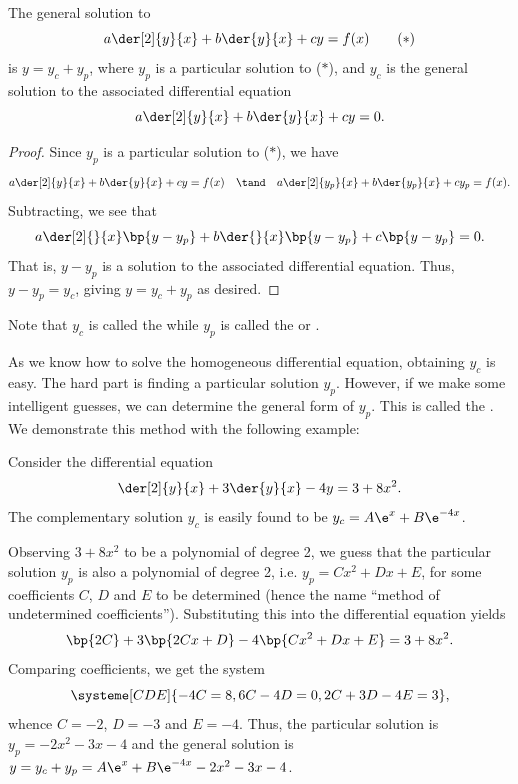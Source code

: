 \begin{theorem}
    The general solution to \[a \der[2]{y}{x} + b \der{y}{x} + c y = f(x) \tag{$\ast$}\] is $y = y_c + y_p$, where $y_p$ is a particular solution to ($\ast$), and $y_c$ is the general solution to the associated differential equation \[a \der[2]{y}{x} + b \der{y}{x} + c y = 0.\]
\end{theorem}
\begin{proof}
    Since $y_p$ is a particular solution to ($\ast$), we have \[a \der[2]{y}{x} + b \der{y}{x} + c y = f(x) \quad \tand \quad a \der[2]{y_p}{x} + b \der{y_p}{x} + c y_p = f(x).\] Subtracting, we see that \[a \der[2]{}{x} \bp{y - y_p} + b \der{}{x} \bp{y - y_p} + c\bp{y - y_p} = 0.\] That is, $y - y_p$ is a solution to the associated differential equation. Thus, $y - y_p = y_c$, giving $y = y_c + y_p$ as desired.
\end{proof}

Note that $y_c$ is called the  while $y_p$ is called the  or .

As we know how to solve the homogeneous differential equation, obtaining $y_c$ is easy. The hard part is finding a particular solution $y_p$. However, if we make some intelligent guesses, we can determine the general form of $y_p$. This is called the . We demonstrate this method with the following example:

\begin{example}
    Consider the differential equation \[\der[2]{y}{x} + 3\der{y}{x} - 4y = 3 + 8x^2.\] The complementary solution $y_c$ is easily found to be $y_c = A\e^x + B\e^{-4x}$.
    
    Observing $3 + 8x^2$ to be a polynomial of degree 2, we guess that the particular solution  $y_p$ is also a polynomial of degree 2, i.e. $y_p = Cx^2 + Dx + E$, for some coefficients $C$, $D$ and $E$ to be determined (hence the name ``method of undetermined coefficients''). Substituting this into the differential equation yields \[\bp{2C} + 3\bp{2Cx + D} - 4\bp{Cx^2 + Dx + E} = 3 + 8x^2.\] Comparing coefficients, we get the system \[\systeme[CDE]{-4C = 8,6C-4D = 0,2C + 3D - 4E = 3},\] whence $C = -2$, $D = -3$ and $E = -4$. Thus, the particular solution is $y_p = -2x^2 - 3x - 4$ and the general solution is $y = y_c + y_p = A\e^x + B\e^{-4x} - 2x^2 - 3x - 4$.
\end{example}

